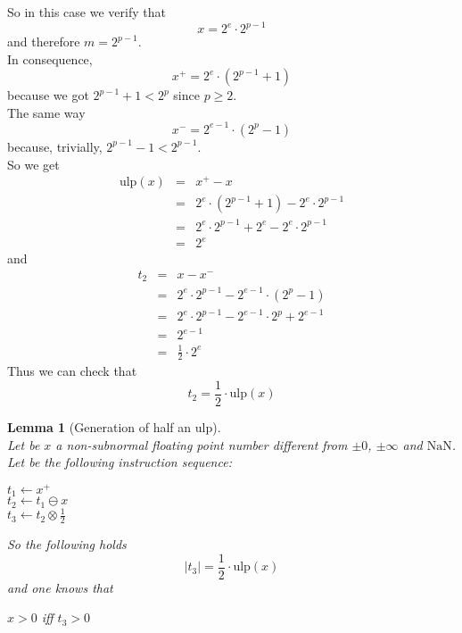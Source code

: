 \documentclass[a4paper,10pt,twoside]{article}
\newtheorem{lemma}[theorem]{Lemma}
\newenvironment{proof}[1][Proof]{\begin{trivlist}
\item[\hskip \labelsep {\bfseries #1}]}{\end{trivlist}}
\newcommand{\qed}{\nobreak \ifvmode \relax \else \ifdim \lastskip<1.5em \hskip-\lastskip
\hskip1.5em plus0em minus0.5em \fi \nobreak \vrule height0.75em width0.5em depth0.25em\fi}
\newcommand{\mUlp}{\ensuremath{\mathrm{ulp}}}
\newcommand{\nan}{\ensuremath{\mathrm{NaN}}}
\begin{document}
\begin{proof}
So in this case we verify that $$x=2^e \cdot 2^{p-1}$$ and therefore $m=2^{p-1}$. \\
In consequence, $$x^+ = 2^e \cdot \left(2^{p-1} + 1 \right)$$ because we got
$2^{p-1} + 1 < 2^p$ since $p \geq 2$. \\
The same way $$x^- = 2^{e-1} \cdot \left(2^p - 1 \right)$$ because, trivially, $2^{p-1} - 1 < 2^{p-1}$.\\
So we get
\begin{eqnarray*}
\mUlp \left( x \right) & = & x^+ - x \\
& = & 2^e \cdot \left( 2^{p-1} + 1 \right) - 2^e \cdot 2^{p-1} \\
& = & 2^e \cdot 2^{p-1} + 2^e - 2^e \cdot 2^{p-1} \\
& = & 2^e
\end{eqnarray*}
and
\begin{eqnarray*}
t_2 & = & x - x^- \\
& = & 2^e \cdot 2^{p-1} - 2^{e-1} \cdot \left( 2^p - 1 \right) \\
& = & 2^e \cdot 2^{p-1} - 2^{e-1} \cdot 2^p + 2^{e-1} \\
& = & 2^{e-1} \\
& = & \frac{1}{2} \cdot 2^e
\end{eqnarray*}
Thus we can check that
$$t_2 = \frac{1}{2} \cdot \mUlp \left( x \right)$$ \qed
\end{proof}
\begin{lemma}[Generation of half an $\mUlp$] \label{genmiulp} ~\\
Let be $x$ a non-subnormal floating point number different from $\pm 0$, $\pm\infty$ and $\nan$.\\
Let be the following instruction sequence:
\begin{center}
$t_1 \gets x^+$ \\
$t_2 \gets t_1 \ominus x$ \\
$t_3 \gets t_2 \otimes \frac{1}{2}$
\end{center}
So the following holds
$$\left \vert t_3 \right \vert = \frac{1}{2} \cdot \mUlp \left( x \right)$$
and one knows that
\begin{center}
$x > 0$ iff $t_3 > 0$
\end{center}
\end{lemma}
\end{document}
